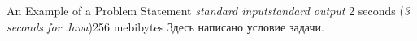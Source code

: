 \begin{problem}{An Example of a Problem Statement}
{\textsl{standard input}}{\textsl{standard output}}
{2 seconds (\textsl{3 seconds for Java})}{256 mebibytes}%
Здесь написано условие задачи.%
\InputFile



\OutputFile


\Examples

\begin{example}
%
\end{example}

\begin{examplewide}
%
\end{examplewide}

\begin{examplethree}
%
\end{examplethree}


\end{problem}
